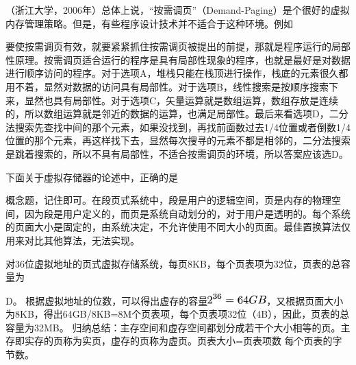 \question （浙江大学，2006年）总体上说，``按需调页''（Demand-Paging）是个很好的虚拟内存管理策略。但是，有些程序设计技术并不适合于这种环境。例如
\par{}
\begin{solution}要使按需调页有效，就要紧紧抓住按需调页被提出的前提，那就是程序运行的局部性原理。按需调页适合运行的程序是具有局部性现象的程序，也就是最好是对数据进行顺序访问的程序。对于选项A，堆栈只能在栈顶进行操作，栈底的元素很久都用不着，显然对数据的访问具有局部性。对于选项B，线性搜索是按顺序搜索下来，显然也具有局部性。对于选项C，矢量运算就是数组运算，数组存放是连续的，所以数组运算就是邻近的数据的运算，也满足局部性。最后来看选项D，二分法搜索先查找中间的那个元素，如果没找到，再找前面数过去1/4位置或者倒数1/4位置的那个元素，再这样找下去，显然每次搜寻的元素不都是相邻的，二分法搜索是跳着搜索的，所以不具有局部性，不适合按需调页的环境，所以答案应该选D。
\end{solution}
\question 下面关于虚拟存储器的论述中，正确的是
\par{}
\begin{solution}概念题，记住即可。在段页式系统中，段是用户的逻辑空间，页是内存的物理空间，因为段是用户定义的，而页是系统自动划分的，对于用户是透明的。每个系统的页面大小是固定的，由系统决定，不允许使用不同大小的页面。最佳置换算法仅用来对比其他算法，无法实现。
\end{solution}
\question 对36位虚拟地址的页式虚拟存储系统，每页8KB，每个页表项为32位，页表的总容量为
\par{}
\begin{solution}D。
根据虚拟地址的位数，可以得出虚存的容量\includegraphics[width=0.89583in,height=0.16667in]{texmath/6eaeb55Cdpi7B3507D25E7B367D3D64GB}，又根据页面大小为8KB，得出64GB/8KB=8M个页表项，每个页表项32位（4B），因此，页表的总容量为32MB。
归纳总结：主存空间和虚存空间都划分成若干个大小相等的页。主存即实存的页称为实页，虚存的页称为虚页。页表大小=页表项数
每个页表的字节数。
\end{solution}
